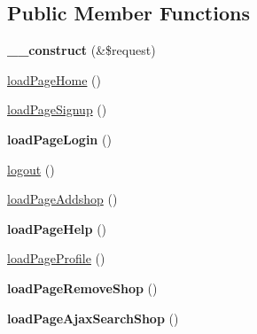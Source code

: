 \subsection*{Public Member Functions}
\begin{DoxyCompactItemize}
\item 
\hypertarget{classBasePageController_a483998015a3518d49897d271de2e3c2d}{{\bfseries \+\_\+\+\_\+construct} (\&\$request)}\label{classBasePageController_a483998015a3518d49897d271de2e3c2d}

\item 
\hyperlink{classBasePageController_a66084d1db3fcc8a5cb1f44cd82b7948a}{load\+Page\+Home} ()
\item 
\hyperlink{classBasePageController_aae6760084899d261e8f19f8dc2cbfd30}{load\+Page\+Signup} ()
\item 
\hypertarget{classBasePageController_a36cdd7c6a038c2664b333fbf8de6383a}{{\bfseries load\+Page\+Login} ()}\label{classBasePageController_a36cdd7c6a038c2664b333fbf8de6383a}

\item 
\hyperlink{classBasePageController_ad065341a301057b6b0dfc3b1e56ed56a}{logout} ()
\item 
\hyperlink{classBasePageController_aecf3ccde53aaa9b780feb5e12f2904ea}{load\+Page\+Addshop} ()
\item 
\hypertarget{classBasePageController_ae7ecc6f491f580059698d1a1a8e8d9ac}{{\bfseries load\+Page\+Help} ()}\label{classBasePageController_ae7ecc6f491f580059698d1a1a8e8d9ac}

\item 
\hyperlink{classBasePageController_affa5617be55ed9bf233fd7bd1b2e19c9}{load\+Page\+Profile} ()
\item 
\hypertarget{classBasePageController_ad63921678e571dbd0a37d3afd6b55f5a}{{\bfseries load\+Page\+Remove\+Shop} ()}\label{classBasePageController_ad63921678e571dbd0a37d3afd6b55f5a}

\item 
\hypertarget{classBasePageController_a96ace79928e80d29e6560b1fb965e859}{{\bfseries load\+Page\+Ajax\+Search\+Shop} ()}\label{classBasePageController_a96ace79928e80d29e6560b1fb965e859}


\end{DoxyCompactItemize}
